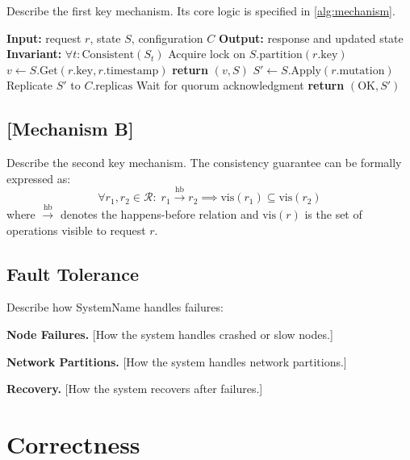 \documentclass[sigplan,10pt]{acmart}
\newcommand{\system}{SystemName\xspace}
\newcommand{\para}[1]{\smallskip\noindent\textbf{#1.}}
\begin{document}
Describe the first key mechanism. Its core logic is specified
in \cref{alg:mechanism}.

\begin{algorithm}[t]
  \caption{[Mechanism A] in \system}
  \label{alg:mechanism}
  \begin{algorithmic}[1]
    \STATE \textbf{Input:} request $r$, state $S$, configuration $C$
    \STATE \textbf{Output:} response and updated state
    \STATE \textbf{Invariant:} $\forall t: \text{Consistent}(S_t)$
    \STATE Acquire lock on $S.\text{partition}(r.\text{key})$
      \STATE $v \leftarrow S.\text{Get}(r.\text{key}, r.\text{timestamp})$
      \STATE \textbf{return} $(v, S)$
    \ELSE
      \STATE $S' \leftarrow S.\text{Apply}(r.\text{mutation})$
      \STATE Replicate $S'$ to $C.\text{replicas}$
      \STATE Wait for quorum acknowledgment
      \STATE \textbf{return} $(\text{OK}, S')$
    \ENDIF
  \end{algorithmic}
\end{algorithm}

\subsection{[Mechanism B]}
\label{sec:design:b}

Describe the second key mechanism. The consistency guarantee can
be formally expressed as:
\begin{equation}
  \label{eq:consistency}
  \forall r_1, r_2 \in \mathcal{R}: \;
  r_1 \xrightarrow{\text{hb}} r_2 \implies
  \text{vis}(r_1) \subseteq \text{vis}(r_2)
\end{equation}
where $\xrightarrow{\text{hb}}$ denotes the happens-before relation
and $\text{vis}(r)$ is the set of operations visible to request $r$.

\subsection{Fault Tolerance}

Describe how \system handles failures:

\para{Node Failures}
[How the system handles crashed or slow nodes.]

\para{Network Partitions}
[How the system handles network partitions.]

\para{Recovery}
[How the system recovers after failures.]

\section{Correctness}
\label{sec:correctness}
\end{document}

